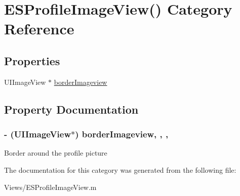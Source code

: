 \hypertarget{category_e_s_profile_image_view_07_08}{}\section{E\+S\+Profile\+Image\+View() Category Reference}
\label{category_e_s_profile_image_view_07_08}
\subsection*{Properties}
\begin{DoxyCompactItemize}
\item 
U\+I\+Image\+View $\ast$ \hyperlink{category_e_s_profile_image_view_07_08_a14771775d412ee1f9b8a837747b05d6a}{border\+Imageview}
\end{DoxyCompactItemize}


\subsection{Property Documentation}
\hypertarget{category_e_s_profile_image_view_07_08_a14771775d412ee1f9b8a837747b05d6a}{}
\subsubsection[{border\+Imageview}]{\setlength{\rightskip}{0pt plus 5cm}-\/ (U\+I\+Image\+View$\ast$) border\+Imageview\hspace{0.3cm}{\ttfamily [read]}, {\ttfamily [write]}, {\ttfamily [nonatomic]}, {\ttfamily [strong]}}\label{category_e_s_profile_image_view_07_08_a14771775d412ee1f9b8a837747b05d6a}
Border around the profile picture 

The documentation for this category was generated from the following file\+:\begin{DoxyCompactItemize}
\item 
Views/E\+S\+Profile\+Image\+View.\+m\end{DoxyCompactItemize}
